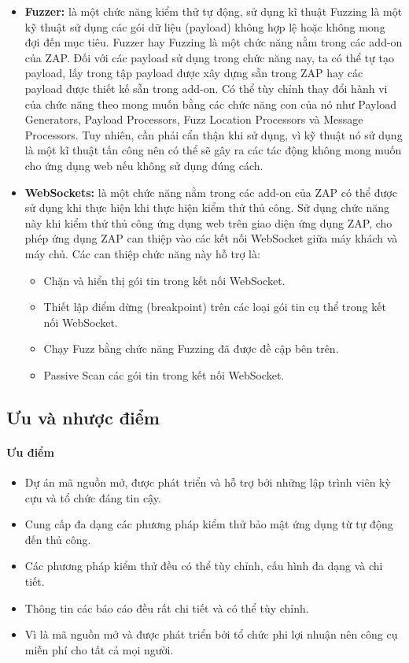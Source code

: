\begin{itemize}
  \item \textbf{Fuzzer:} là một chức năng kiểm thử tự động, sử dụng kĩ thuật Fuzzing là một kỹ thuật sử dụng các gói dữ liệu (payload) không hợp lệ hoặc không mong đợi đến mục tiêu. Fuzzer hay Fuzzing là một chức năng nằm trong các add-on của ZAP. Đối với các payload sử dụng trong chức năng nay, ta có thể tự tạo payload, lấy trong tập payload được xây dựng sẵn trong ZAP hay các payload được thiết kế sẵn trong add-on. Có thể tùy chỉnh thay đổi hành vi của chức năng theo mong muốn bằng các chức năng con của nó như Payload Generators, Payload Processors, Fuzz Location Processors và Message Processors. Tuy nhiên, cần phải cẩn thận khi sử dụng, vì kỹ thuật nó sử dụng là một kĩ thuật tấn công nên có thể sẽ gây ra các tác động không mong muốn cho ứng dụng web nếu không sử dụng đúng cách.
  \item \textbf{WebSockets:} là một chức năng nằm trong các add-on của ZAP có thể được sử dụng khi thực hiện khi thực hiện kiểm thử thủ công. Sử dụng chức năng này khi kiểm thử thủ công ứng dụng web trên giao diện ứng dụng ZAP, cho phép ứng dụng ZAP can thiệp vào các kết nối WebSocket giữa máy khách và máy chủ. Các can thiệp chức năng này hỗ trợ là:
        \begin{itemize}
          \item Chặn và hiển thị gói tin trong kết nối WebSocket.
          \item Thiết lập điểm dừng (breakpoint) trên các loại gói tin cụ thể trong kết nối WebSocket.
          \item Chạy Fuzz bằng chức năng Fuzzing đã được đề cập bên trên.
          \item Passive Scan các gói tin trong kết nối WebSocket.
        \end{itemize}
\end{itemize}

\subsection{Ưu và nhược điểm}

\paragraph{Ưu điểm}
\begin{itemize}
  \item Dự án mã nguồn mở, được phát triển và hỗ trợ bởi những lập trình viên kỳ cựu và tổ chức đáng tin cậy.
  \item Cung cấp đa dạng các phương pháp kiểm thử bảo mật ứng dụng từ tự động đến thủ công.
  \item Các phương pháp kiểm thử đều có thể tùy chỉnh, cấu hình đa dạng và chi tiết.
  \item Thông tin các báo cáo đều rất chi tiết và có thể tùy chỉnh.
  \item Vì là mã nguồn mở và được phát triển bởi tổ chức phi lợi nhuận nên công cụ miễn phí cho tất cả mọi người.
\end{itemize}

